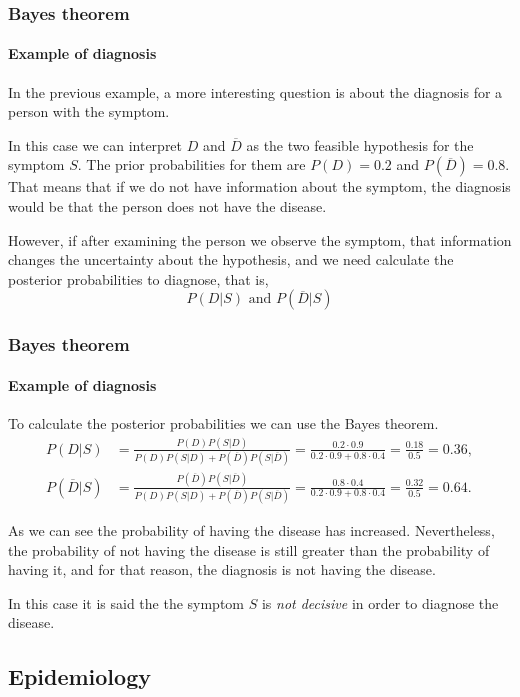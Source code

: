\begin{frame}
\frametitle{Bayes theorem}
\framesubtitle{Example of diagnosis}
In the previous example, a more interesting question is about the diagnosis for a person with the symptom.  

In this case we can interpret $D$ and $\overline{D}$ as the two feasible hypothesis for the symptom $S$.
The prior probabilities for them are $P(D)=0.2$ and $P(\overline{D})=0.8$.
That means that if we do not have information about the symptom, the diagnosis would be that the person does not have the disease.

However, if after examining the person we observe the symptom, that information changes the uncertainty about the hypothesis, and we need calculate the posterior probabilities to diagnose, that is,
\[
P(D|S) \mbox{ and } P(\overline{D}|S)
\]
\end{frame}


\begin{frame}
\frametitle{Bayes theorem}
\framesubtitle{Example of diagnosis}
To calculate the posterior probabilities we can use the Bayes theorem.
\begin{align*}
P(D|S) &= \frac{P(D)P(S|D)}{P(D)P(S|D)+P(\overline{D})P(S|\overline{D})} = \frac{0.2\cdot 0.9}{0.2\cdot 0.9 + 0.8\cdot 0.4} = \frac{0.18}{0.5}=0.36,\\
P(\overline{D}|S) &= \frac{P(\overline{D})P(S|\overline{D})}{P(D)P(S|D)+P(\overline{D})P(S|\overline{D})} = \frac{0.8\cdot 0.4}{0.2\cdot 0.9 + 0.8\cdot 0.4} = \frac{0.32}{0.5}=0.64.
\end{align*}

As we can see the probability of having the disease has increased. 
Nevertheless, the probability of not having the disease is still greater than the probability of having it, and for that
reason, the diagnosis is not having the disease. 

In this case it is said the the symptom $S$ is \emph{not decisive} in order to diagnose the disease.
\end{frame}


\subsection{Epidemiology}

